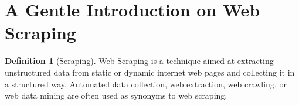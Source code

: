 \documentclass[
  12pt,
  a4paper,
  oneside]{book}
\theoremstyle{definition}
\newtheorem{definition}{Definition}[chapter]
\theoremstyle{definition}
\theoremstyle{definition}
\theoremstyle{remark}
\begin{document}
\hypertarget{a-gentle-introduction-on-web-scraping}{%
\section{A Gentle Introduction on Web Scraping}\label{a-gentle-introduction-on-web-scraping}}

\begin{definition}[Scraping]
\protect\hypertarget{def:scraping}{}{\label{def:scraping} {} }Web Scraping is a technique aimed at extracting unstructured data from static or dynamic internet web pages and collecting it in a structured way.
Automated data collection, web extraction, web crawling, or web data mining are often used as synonyms to web scraping.
\end{definition}
\end{document}
